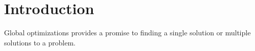 
\chapter{Introduction}
\label{introduction}

Global optimizations provides a promise to finding a single solution or multiple solutions to a problem. 
